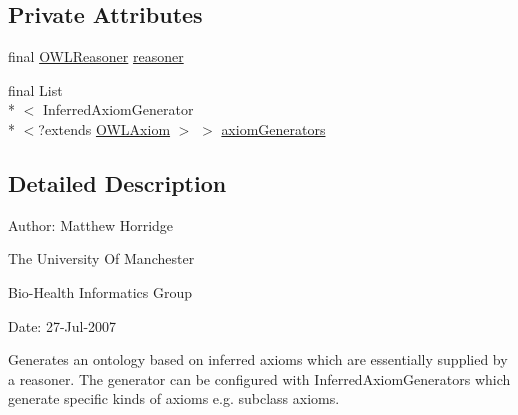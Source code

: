 \subsection*{Private Attributes}
\begin{DoxyCompactItemize}
\item 
final \hyperlink{interfaceorg_1_1semanticweb_1_1owlapi_1_1reasoner_1_1_o_w_l_reasoner}{O\-W\-L\-Reasoner} \hyperlink{classorg_1_1semanticweb_1_1owlapi_1_1util_1_1_inferred_ontology_generator_a8ce0bb500eee27e86154042020116fda}{reasoner}
\item 
final List\\*
$<$ Inferred\-Axiom\-Generator\\*
$<$?extends \hyperlink{interfaceorg_1_1semanticweb_1_1owlapi_1_1model_1_1_o_w_l_axiom}{O\-W\-L\-Axiom} $>$ $>$ \hyperlink{classorg_1_1semanticweb_1_1owlapi_1_1util_1_1_inferred_ontology_generator_ab09a0a93f836a169c298b18df6ea7f04}{axiom\-Generators}
\end{DoxyCompactItemize}


\subsection{Detailed Description}
Author\-: Matthew Horridge\par
 The University Of Manchester\par
 Bio-\/\-Health Informatics Group\par
 Date\-: 27-\/\-Jul-\/2007\par
\par
 

Generates an ontology based on inferred axioms which are essentially supplied by a reasoner. The generator can be configured with {\ttfamily Inferred\-Axiom\-Generator}s which generate specific kinds of axioms e.\-g. subclass axioms. 

